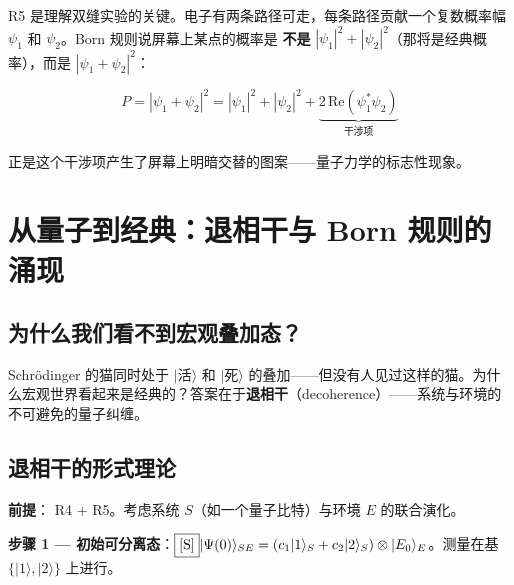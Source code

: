 \begin{center}
\end{center}

R5 是理解双缝实验的关键。电子有两条路径可走，每条路径贡献一个复数概率幅 $\psi_1$ 和 $\psi_2$。Born 规则说屏幕上某点的概率是 \textbf{不是} $|\psi_1|^2 + |\psi_2|^2$（那将是经典概率），而是 $|\psi_1 + \psi_2|^2$：

\[
P = |\psi_1 + \psi_2|^2 = |\psi_1|^2 + |\psi_2|^2 + \underbrace{2\,\text{Re}(\psi_1^*\psi_2)}_{\text{干涉项}}
\]

正是这个干涉项产生了屏幕上明暗交替的图案——量子力学的标志性现象。

\section{从量子到经典：退相干与 Born 规则的涌现}

\subsection{为什么我们看不到宏观叠加态？}

Schr\"odinger 的猫同时处于 $|\text{活}\rangle$ 和 $|\text{死}\rangle$ 的叠加——但没有人见过这样的猫。为什么宏观世界看起来是经典的？答案在于\textbf{退相干}（decoherence）——系统与环境的不可避免的量子纠缠。

\subsection{退相干的形式理论}

\textbf{前提}：\fbox{[N]} R4 + R5。考虑系统 $S$（如一个量子比特）与环境 $E$ 的联合演化。

\textbf{步骤 1 — 初始可分离态}：$\fbox{[S]}
|\Psi(0)\rangle_{SE} = (c_1|1\rangle_S + c_2|2\rangle_S) \otimes |E_0\rangle_E
$。测量在基 $\{|1\rangle,|2\rangle\}$ 上进行。

